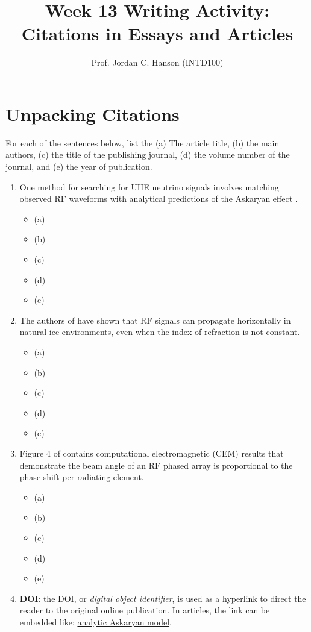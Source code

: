\documentclass{article}
\begin{document}
\title{Week 13 Writing Activity: Citations in Essays and Articles}
\author{Prof. Jordan C. Hanson (INTD100)}

\maketitle

\section{Unpacking Citations}

For each of the sentences below, list the (a) The article title, (b) the main authors, (c) the title of the publishing journal, (d) the volume number of the journal, and (e) the year of publication.

\begin{enumerate}
\item One method for searching for UHE neutrino signals involves matching observed RF waveforms with analytical predictions of the Askaryan effect \cite{HH}.
\begin{itemize}
\item (a)
\item (b)
\item (c)
\item (d)
\item (e)
\end{itemize}
\item The authors of \cite{horiz} have shown that RF signals can propagate horizontally in natural ice environments, even when the index of refraction is not constant.
\begin{itemize}
\item (a)
\item (b)
\item (c)
\item (d)
\item (e)
\end{itemize}
\item Figure 4 of \cite{H} contains computational electromagnetic (CEM) results that demonstrate the beam angle of an RF phased array is proportional to the phase shift per radiating element.
\begin{itemize}
\item (a)
\item (b)
\item (c)
\item (d)
\item (e)
\end{itemize}
\item \textbf{DOI}: the DOI, or \textit{digital object identifier}, is used as a hyperlink to direct the reader to the original online publication.  In articles, the link can be embedded like: \href{https://doi.org/10.1103/PhysRevD.105.123019}{analytic Askaryan model}.
\end{enumerate}
\end{document}
